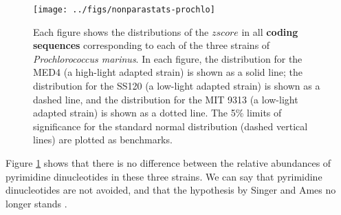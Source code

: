 \documentclass{article}
\begin{document}
\begin{figure}[H]
   \begin{center}
\texttt{[image: ../figs/nonparastats-prochlo]}
\end{center}
   \caption{Each figure shows the distributions of the $zscore$ in all
     \textbf{coding sequences} corresponding to each of the three
     strains of \textit{Prochlorococcus marinus}. In each figure, the
     distribution for the MED4 (a high-light adapted strain) is shown
     as a solid line; the distribution for the SS120 (a low-light
     adapted strain) is shown as a dashed line, and the distribution
     for the MIT 9313 (a low-light adapted strain) is shown as a
     dotted line. The 5\% limits of significance for the standard
     normal distribution (dashed vertical lines) are plotted as
     benchmarks.}
\label{prochlo}
\end{figure}

Figure \ref{prochlo} shows that there is no difference between the
relative abundances of pyrimidine dinucleotides in these three
strains. We can say that pyrimidine dinucleotides are not avoided, and
that the hypothesis by Singer and Ames \cite{Singer} no longer stands
\cite{UV}.


\clearpage
{}


\end{document}

